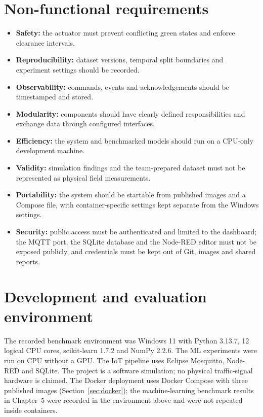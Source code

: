 \documentclass[12pt,a4paper,oneside]{report}
\begin{document}
\section{Non-functional requirements}
\begin{itemize}
  \item \textbf{Safety:} the actuator must prevent conflicting green states and enforce clearance intervals.
  \item \textbf{Reproducibility:} dataset versions, temporal split boundaries and experiment settings should be recorded.
  \item \textbf{Observability:} commands, events and acknowledgements should be timestamped and stored.
  \item \textbf{Modularity:} components should have clearly defined responsibilities and exchange data through configured interfaces.
  \item \textbf{Efficiency:} the system and benchmarked models should run on a CPU-only development machine.
  \item \textbf{Validity:} simulation findings and the team-prepared dataset must not be represented as physical field measurements.
  \item \textbf{Portability:} the system should be startable from published images and a Compose file, with container-specific settings kept separate from the Windows settings.
  \item \textbf{Security:} public access must be authenticated and limited to the dashboard; the MQTT port, the SQLite database and the Node-RED editor must not be exposed publicly, and credentials must be kept out of Git, images and shared reports.
\end{itemize}

\section{Development and evaluation environment}
The recorded benchmark environment was Windows 11 with Python 3.13.7, 12 logical CPU cores, scikit-learn 1.7.2 and NumPy 2.2.6. The ML experiments were run on CPU without a GPU. The IoT pipeline uses Eclipse Mosquitto, Node-RED and SQLite. The project is a software simulation; no physical traffic-signal hardware is claimed. The Docker deployment uses Docker Compose with three published images (Section~\ref{sec:docker}); the machine-learning benchmark results in Chapter~5 were recorded in the environment above and were not repeated inside containers.
\end{document}
